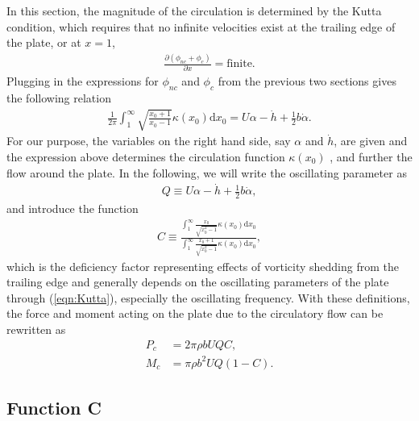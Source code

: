 In this section, the magnitude of the circulation is determined by the Kutta condition, which requires that no infinite velocities exist at the trailing edge of the plate, or at $x = 1$,
\begin{align}
\frac{\partial (\phi_{nc} + \phi_c)}{\partial x} = \text{finite}.
\end{align}
Plugging in the expressions for $\phi_{nc}$ and $\phi_c$ from the previous two sections gives the following relation
\begin{align}       \label{eqn:Kutta}
\frac{1}{2\pi} \int_{1}^{\infty} \sqrt{\frac{x_0+1}{x_0-1}} \kappa(x_0) \mathrm{d}x_0 = U \alpha - \dot{h} + \frac{1}{2}b\dot{\alpha}.
\end{align}
For our purpose, the variables on the right hand side, say $\alpha$ and $\dot{h}$, are given and the expression above determines the circulation function $\kappa(x_0)$ , and further the flow around the plate. 
In the following, we will write the oscillating parameter as
\begin{align}
Q \equiv U \alpha - \dot{h} + \frac{1}{2}b\dot{\alpha},
\end{align}
and introduce the function
\begin{align}
C \equiv \frac{\int_{1}^{\infty} \frac{x_0}{\sqrt{x_0^2-1}} \kappa(x_0) \mathrm{d}x_0}{\int_{1}^{\infty} \frac{x_0+1}{\sqrt{x_0^2-1}} \kappa(x_0) \mathrm{d}x_0},
\end{align}
which is the deficiency factor representing effects of vorticity shedding from the trailing edge and generally depends on the oscillating parameters of the plate through (\ref{eqn:Kutta}), especially the oscillating frequency.
With these definitions, the force and moment acting on the plate due to the circulatory flow can be rewritten as
\begin{align}
P_c & = 2\pi \rho b U Q C,  \\
M_c & = \pi \rho b^2 U Q (1 - C).
\end{align}

\subsection{Function C}

